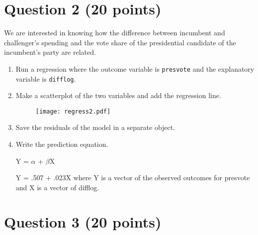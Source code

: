 \documentclass[12pt,letterpaper]{article}
\begin{document}
	
	\section*{Question 2 (20 points)}
\noindent We are interested in knowing how the difference between incumbent and challenger's spending and the vote share of the presidential candidate of the incumbent's party are related.	\vspace{.25cm}
	\begin{enumerate}
		\item Run a regression where the outcome variable is \texttt{presvote} and the explanatory variable is \texttt{difflog}.
		  
		\vspace{.25cm}

		\item Make a scatterplot of the two variables and add the regression line. 	
		  
		
		\begin{figure}[h!]\centering
		\caption{\footnotesize }
		\label{fig:plot_1}
		\texttt{[image: regress2.pdf]}
		\end{figure}
		\vspace{.25cm}
		
		\newpage
		
		\item Save the residuals of the model in a separate object.
		  
		
		\item Write the prediction equation.
		
		Y = $\alpha$ + $\beta$X
		
		\vspace{.15cm}
	
		Y = .507 + .023X where Y is a vector of the observed outcomes for presvote and X is a vector of difflog.
  
	\end{enumerate}

	
\section*{Question 3 (20 points)}
\end{document}
